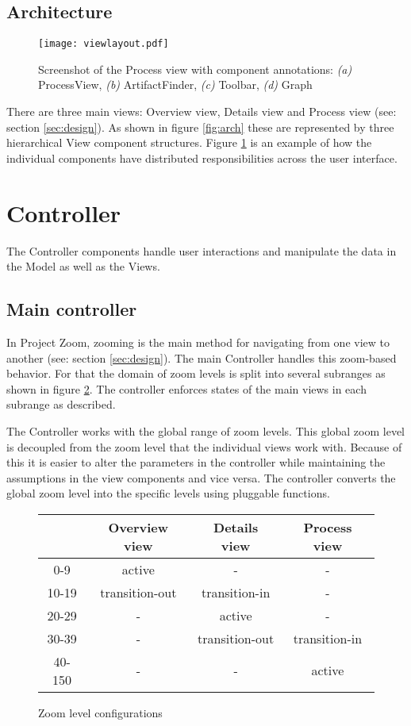 \subsection{Architecture}

\begin{figure}
\texttt{[image: viewlayout.pdf]}
\caption[Screenshot of the Process view with component annotations]{Screenshot of the Process view with component annotations: \textit{(a)} ProcessView, \textit{(b)} ArtifactFinder, \textit{(c)} Toolbar, \textit{(d)} Graph}
\label{fig:viewlayout}
\end{figure}

There are three main views: Overview view, Details view and Process view (see: section \ref{sec:design}). As shown in figure \ref{fig:arch} these are represented by three hierarchical View component structures. Figure \ref{fig:viewlayout} is an example of how the individual components have distributed responsibilities across the user interface.

\section{Controller}

The Controller components handle user interactions and manipulate the data in the Model as well as the Views.

\subsection{Main controller}
In Project Zoom, zooming is the main method for navigating from one view to another (see: section \ref{sec:design}). The main Controller handles this zoom-based behavior. For that the domain of zoom levels is split into several subranges as shown in figure \ref{fig:zoomtable}. The controller enforces states of the main views in each subrange as described.

The Controller works with the global range of zoom levels. This global zoom level is decoupled from the zoom level that the individual views work with. Because of this it is easier to alter the parameters in the controller while maintaining the assumptions in the view components and vice versa. The controller converts the global zoom level into the specific levels using pluggable functions.

\begin{figure}
\begin{center}
\begin{tabular}{|c|c|c|c|}
\hline
& Overview view & Details view & Process view \\ \hline
0-9 & active & - & - \\
10-19 & transition-out & transition-in & - \\
20-29 & - & active & - \\
30-39 & - & transition-out & transition-in \\
40-150 & - & - & active \\ \hline
\end{tabular}
\end{center}
\caption{Zoom level configurations}
\label{fig:zoomtable}
\end{figure}


